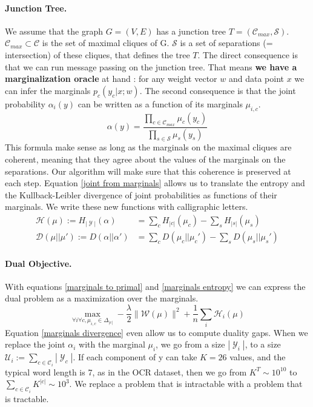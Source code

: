 \documentclass{article}
\DeclareMathOperator{\1}{\mathbb{1}}
\DeclareMathOperator{\Y}{\mathcal{Y}}
\begin{document}
\paragraph{Junction Tree.}
We assume that the graph $G=(V,E)$ has a junction tree $T=(\mathcal C_{max},\mathcal{S})$.
$\mathcal C_{max} \subset \mathcal C $ is the set of maximal cliques of G.
$\mathcal S$ is a set of separations (= intersection) of these cliques, that defines the tree $T$.
The direct consequence is that we can run message passing on the junction tree.
That means \textbf{we have a marginalization oracle} at hand : for any weight vector $w$ and data point $x$ we can infer the marginals $p_c(y_c |x ; w)$.
The second consequence is that the joint probability $\alpha_i(y)$ can be written as a function of its marginals $\mu_{i, c}$.
\begin{equation}
	\label{joint from marginals}
	\alpha(y) = \frac{\prod_{c\in\mathcal{C}_{max}} \mu_c(y_c)}{\prod_{s\in\mathcal{S}} \mu_s(y_s)}
\end{equation}
This formula make sense as long as the marginals on the maximal cliques are coherent, meaning that they agree about the values of the marginals on the separations.
Our algorithm will make sure that this coherence is preserved at each step.
Equation \ref{joint from marginals} allows us to translate the entropy and the Kullback-Leibler divergence of joint probabilities as functions of their marginals. We write these new functions with calligraphic letters.
\begin{align}
	\label{marginals entropy}
	\mathcal H (\mu) := H_{|\Y|} (\alpha) & = \sum_c H_{|c|}(\mu_c) - \sum_s H_{|s|}(\mu_s) \\
	\label{marginals divergence}
	\mathcal D (\mu||\mu') := D(\alpha||\alpha') & = \sum_c D(\mu_c||\mu_c') - \sum_s D(\mu_s||\mu_s')
\end{align}


\paragraph{Dual Objective.}
With equations \ref{marginals to primal} and \ref{marginals entropy} we can express the dual problem as a maximization over the marginals.
\begin{equation}
	\max_{\forall i \forall c, \mu_{i, c} \in \Delta_{|c|} } - \frac{\lambda}{2} \| \mathcal W(\mu)\|^2 + \frac{1}{n} \sum_i \mathcal H _ i(\mu)
\end{equation}
Equation \ref{marginals divergence} even allow us to compute duality gaps.
When we replace the joint $\alpha_i$ with the marginal $\mu_i$, we go from a size $|\Y_i|$, to a size $\mathcal U_i := \sum_{c \in \mathcal C_i} |\Y_c|$.
If each component of y can take $K=26$ values, and the typical word length is 7, as in the OCR dataset, then we go from $K^T \sim 10^{10}$ to $\sum_{c \in \mathcal C_i} K^{|c|} \sim 10^3$.
We replace a problem that is intractable with a problem that is tractable.
\end{document}

